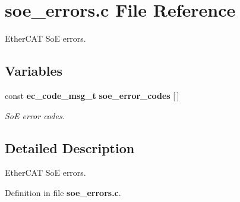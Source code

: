 \section{soe\-\_\-errors.\-c \-File \-Reference}
\label{soe__errors_8c}


\-Ether\-C\-A\-T \-So\-E errors.  


\subsection*{\-Variables}
\begin{DoxyCompactItemize}
\item 
const {\bf ec\-\_\-code\-\_\-msg\-\_\-t} {\bf soe\-\_\-error\-\_\-codes} [$\,$]\label{soe__errors_8c_a4013ee44d8165e19ed7abec334d499e4}

\begin{DoxyCompactList}\small\item\em \-So\-E error codes. \end{DoxyCompactList}\end{DoxyCompactItemize}


\subsection{\-Detailed \-Description}
\-Ether\-C\-A\-T \-So\-E errors. 

\-Definition in file {\bf soe\-\_\-errors.\-c}.

